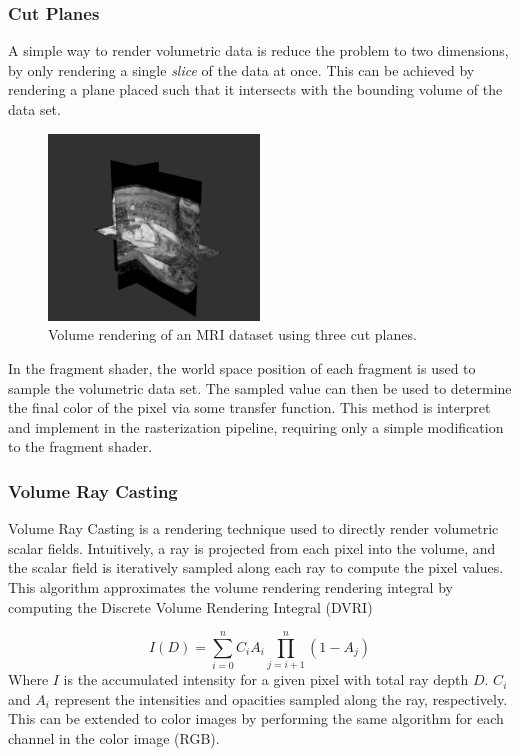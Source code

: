 \documentclass{article}
\begin{document}
\subsubsection{Cut Planes}
A simple way to render volumetric data is reduce the problem to two dimensions, by only rendering a single \textit{slice} of the data
at once. This can be achieved by rendering a plane placed such that it intersects with the bounding volume of the 
data set. 
\begin{figure}[tbh!]
    \centering
    \includegraphics[width=0.5\textwidth]{images/CutPlanes.png}
    \caption{Volume rendering of an MRI dataset using three cut planes.}
    \label{fig:cutPlanes}
\end{figure}
In the fragment shader, the world space position of each fragment is used to sample the volumetric data set. The sampled value can then be used to determine the final color of the pixel via some transfer function.
This method is interpret and implement in the rasterization pipeline, requiring only a simple modification to the fragment shader. 

\subsubsection{Volume Ray Casting}
Volume Ray Casting is a rendering technique used to directly render volumetric scalar fields.
Intuitively, a ray is projected from each pixel into the volume,
and the scalar field is iteratively sampled along each ray to compute the pixel values.
This algorithm approximates the volume rendering rendering integral by computing the Discrete Volume Rendering Integral (DVRI) 

$$ I(D) = \sum_{i=0}^n C_iA_i\prod_{j=i+1}^{n}(1-A_j)$$
Where $I$ is the accumulated intensity for a given pixel with total ray depth $D$.
$C_i$ and $A_i$ represent the intensities and opacities sampled along the ray, respectively. This
can be extended to color images by performing the same algorithm for each channel in the color image (RGB).
\end{document}
